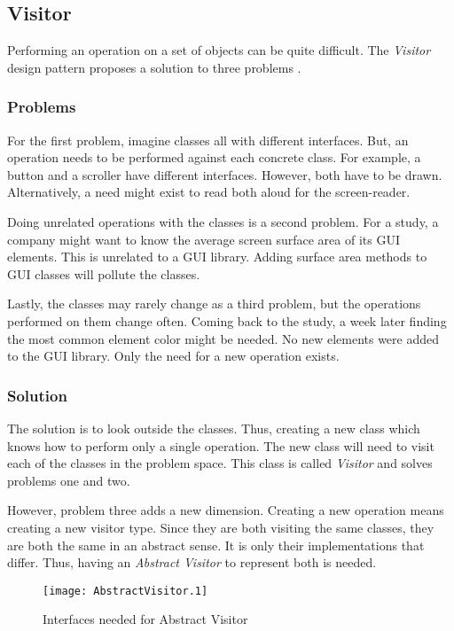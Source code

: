 \subsection{Visitor}
Performing an operation on a set of objects can be quite difficult.
The \textit{Visitor} design pattern proposes a solution to three problems \cite{gamma_94_01}.

\subsubsection{Problems}
For the first problem, imagine classes all with different interfaces.
But, an operation needs to be performed against each concrete class.
For example, a button and a scroller have different interfaces.
However, both have to be drawn.
Alternatively, a need might exist to read both aloud for the screen-reader.

Doing unrelated operations with the classes is a second problem.
For a study, a company might want to know the average screen surface area of its GUI elements.
This is unrelated to a GUI library.
Adding surface area methods to GUI classes will pollute the classes.

Lastly, the classes may rarely change as a third problem, but the operations performed on them change often.
Coming back to the study, a week later finding the most common element color might be needed.
No new elements were added to the GUI library.
Only the need for a new operation exists.

\subsubsection{Solution}
The solution is to look outside the classes.
Thus, creating a new class which knows how to perform only a single operation.
The new class will need to visit each of the classes in the problem space.
This class is called \textit{Visitor} and solves problems one and two.

However, problem three adds a new dimension.
Creating a new operation means creating a new visitor type.
Since they are both visiting the same classes, they are both the same in an abstract sense.
It is only their implementations that differ.
Thus, having an \textit{Abstract Visitor} to represent both is needed.

\begin{figure}[h]
	\centering
	\texttt{[image: AbstractVisitor.1]}
	\caption{Interfaces needed for Abstract Visitor}
	\label{fig:AbstractVisitorInterface}
\end{figure}

